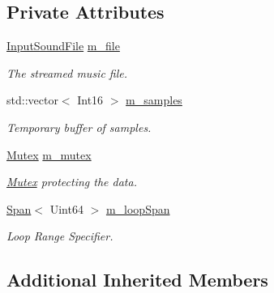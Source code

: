 \subsection*{Private Attributes}
\begin{DoxyCompactItemize}
\item 
\mbox{\label{classsf_1_1_music_a902ed2518e4597b0d22c47c6ab418b08}} 
\mbox{\hyperlink{classsf_1_1_input_sound_file}{Input\+Sound\+File}} \mbox{\hyperlink{classsf_1_1_music_a902ed2518e4597b0d22c47c6ab418b08}{m\+\_\+file}}
\begin{DoxyCompactList}\small\item\em The streamed music file. \end{DoxyCompactList}\item 
\mbox{\label{classsf_1_1_music_af9a047420c96cf7d3013404b6125c5c3}} 
std\+::vector$<$ Int16 $>$ \mbox{\hyperlink{classsf_1_1_music_af9a047420c96cf7d3013404b6125c5c3}{m\+\_\+samples}}
\begin{DoxyCompactList}\small\item\em Temporary buffer of samples. \end{DoxyCompactList}\item 
\mbox{\label{classsf_1_1_music_a47cf4b92edf2f2e936a91b8a5cfa6824}} 
\mbox{\hyperlink{classsf_1_1_mutex}{Mutex}} \mbox{\hyperlink{classsf_1_1_music_a47cf4b92edf2f2e936a91b8a5cfa6824}{m\+\_\+mutex}}
\begin{DoxyCompactList}\small\item\em \mbox{\hyperlink{classsf_1_1_mutex}{Mutex}} protecting the data. \end{DoxyCompactList}\item 
\mbox{\label{classsf_1_1_music_abd4117b6ab142d040ceee626fb15e12f}} 
\mbox{\hyperlink{structsf_1_1_music_1_1_span}{Span}}$<$ Uint64 $>$ \mbox{\hyperlink{classsf_1_1_music_abd4117b6ab142d040ceee626fb15e12f}{m\+\_\+loop\+Span}}
\begin{DoxyCompactList}\small\item\em Loop Range Specifier. \end{DoxyCompactList}\end{DoxyCompactItemize}
\subsection*{Additional Inherited Members}


